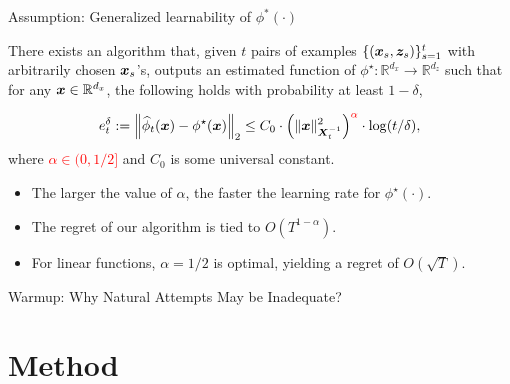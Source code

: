 \documentclass[10pt, xcolor={dvipsnames,x11names},compress]{beamer}
\begin{document}
\begin{frame}{Assumption: Generalized learnability of $\phi^*(\cdot)$}


There exists an algorithm that, given $t$ pairs of examples $\{({\bm{x}}_s, {\bm{z}}_s)\}_{s=1}^t$ with  arbitrarily chosen ${\bm{x}}_s$'s,   outputs an estimated function of $\phi^\star: \mathbb{R}^{d_x} \rightarrow \mathbb{R}^{d_z}$ such that for any ${\bm{x}}\in \mathbb{R}^{d_x}$,  the following holds with probability at least $1-\delta$, 

\begin{align}
     e_t^\delta:=\left\|\widehat{\phi}_t(\boldsymbol{x})-\phi^{\star}(\boldsymbol{x})\right\|_2 \leq C_0 \cdot\left(\|\boldsymbol{x}\|_{\boldsymbol{X}_t^{-1}}^2\right)^{\textcolor{red}{\alpha}} \cdot \log (t / \delta), \nonumber
\end{align}
where \textcolor{red}{$\alpha \in (0, 1/2]$} and $C_0$ is some universal constant. 

\vspace{+10pt}

\begin{itemize}
    \item The larger the value of $\alpha$, the faster the learning rate for $\phi^{\star}(\cdot)$.
    \item The regret of our algorithm is tied to $O(T^{1-\alpha})$.
    \item For linear functions, $\alpha = 1/2$ is optimal, yielding a regret of $O(\sqrt{T})$.
\end{itemize}

\end{frame}

\begin{frame}[label=warmup]{Warmup: Why Natural Attempts May be Inadequate?}

\end{frame}

\section{Method}
\end{document}
